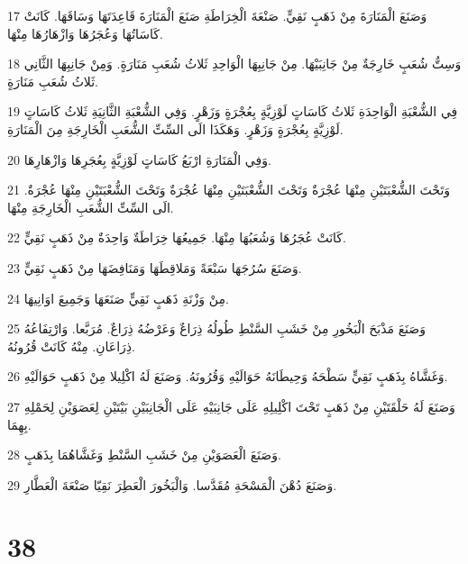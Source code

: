 \par 17 وَصَنَعَ الْمَنَارَةَ مِنْ ذَهَبٍ نَقِيٍّ. صَنْعَةَ الْخِرَاطَةِ صَنَعَ الْمَنَارَةَ قَاعِدَتَهَا وَسَاقَهَا. كَانَتْ كَاسَاتُهَا وَعُجَرُهَا وَازْهَارُهَا مِنْهَا.
\par 18 وَسِتُّ شُعَبٍ خَارِجَةٌ مِنْ جَانِبَيْهَا. مِنْ جَانِبِهَا الْوَاحِدِ ثَلاثُ شُعَبِ مَنَارَةٍ. وَمِنْ جَانِبِهَا الثَّانِي ثَلاثُ شُعَبِ مَنَارَةٍ.
\par 19 فِي الشُّعْبَةِ الْوَاحِدَةِ ثَلاثُ كَاسَاتٍ لَوْزِيَّةٍ بِعُجْرَةٍ وَزَهْرٍ. وَفِي الشُّعْبَةِ الثَّانِيَةِ ثَلاثُ كَاسَاتٍ لَوْزِيَّةٍ بِعُجْرَةٍ وَزَهْرٍ. وَهَكَذَا الَى السِّتِّ الشُّعَبِ الْخَارِجَةِ مِنَ الْمَنَارَةِ.
\par 20 وَفِي الْمَنَارَةِ ارْبَعُ كَاسَاتٍ لَوْزِيَّةٍ بِعُجَرِهَا وَازْهَارِهَا.
\par 21 وَتَحْتَ الشُّعْبَتَيْنِ مِنْهَا عُجْرَةٌ وَتَحْتَ الشُّعْبَتَيْنِ مِنْهَا عُجْرَةٌ وَتَحْتَ الشُّعْبَتَيْنِ مِنْهَا عُجْرَةٌ. الَى السِّتِّ الشُّعَبِ الْخَارِجَةِ مِنْهَا.
\par 22 كَانَتْ عُجَرُهَا وَشُعَبُهَا مِنْهَا. جَمِيعُهَا خِرَاطَةٌ وَاحِدَةٌ مِنْ ذَهَبٍ نَقِيٍّ.
\par 23 وَصَنَعَ سُرُجَهَا سَبْعَةً وَمَلاقِطَهَا وَمَنَافِضَهَا مِنْ ذَهَبٍ نَقِيٍّ.
\par 24 مِنْ وَزْنَةِ ذَهَبٍ نَقِيٍّ صَنَعَهَا وَجَمِيعَ اوَانِيهَا.
\par 25 وَصَنَعَ مَذْبَحَ الْبَخُورِ مِنْ خَشَبِ السَّنْطِ طُولُهُ ذِرَاعٌ وَعَرْضُهُ ذِرَاعٌ. مُرَبَّعا. وَارْتِفَاعُهُ ذِرَاعَانِ. مِنْهُ كَانَتْ قُرُونُهُ.
\par 26 وَغَشَّاهُ بِذَهَبٍ نَقِيٍّ سَطْحَهُ وَحِيطَانَهُ حَوَالَيْهِ وَقُرُونَهُ. وَصَنَعَ لَهُ اكْلِيلا مِنْ ذَهَبٍ حَوَالَيْهِ.
\par 27 وَصَنَعَ لَهُ حَلْقَتَيْنِ مِنْ ذَهَبٍ تَحْتَ اكْلِيلِهِ عَلَى جَانِبَيْهِ عَلَى الْجَانِبَيْنِ بَيْتَيْنِ لِعَصَوَيْنِ لِحَمْلِهِ بِهِمَا.
\par 28 وَصَنَعَ الْعَصَوَيْنِ مِنْ خَشَبِ السَّنْطِ وَغَشَّاهُمَا بِذَهَبٍ.
\par 29 وَصَنَعَ دُهْنَ الْمَسْحَةِ مُقَدَّسا. وَالْبَخُورَ الْعَطِرَ نَقِيّا صَنْعَةَ الْعَطَّارِ.

\chapter{38}

